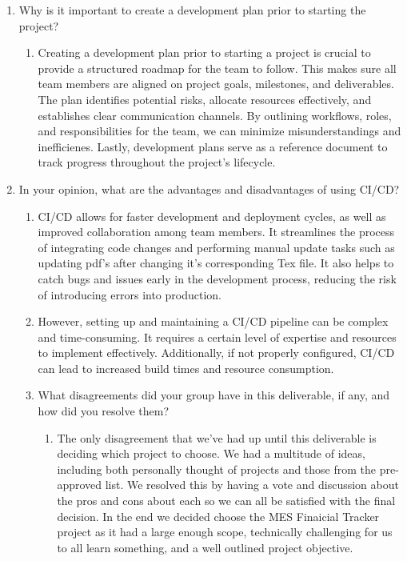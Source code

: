 \documentclass{article}
\begin{document}
\begin{enumerate}
    \item Why is it important to create a development plan prior to starting the
    project?
    \begin{enumerate}
      \item Creating a development plan prior to starting a project is crucial to provide a 
      structured roadmap for the team to follow. This makes sure all team members are aligned on 
      project goals, milestones, and deliverables. The plan identifies potential risks, allocate resources
      effectively, and establishes clear communication channels. By outlining workflows, roles, 
      and responsibilities for the team, we can minimize misunderstandings and inefficienes. Lastly, 
      development plans serve as a reference document to track progress throughout the project's lifecycle.
    \end{enumerate}
    \item In your opinion, what are the advantages and disadvantages of using
    CI/CD?
    \begin{enumerate}
        \item CI/CD allows for faster development and deployment cycles, as well as
        improved collaboration among team members. It streamlines the process of integrating code changes and performing manual update tasks such as updating pdf's after changing it's corresponding Tex file.
        It also helps to catch bugs and issues early in the development process, reducing the risk of introducing errors into production.
        \item However, setting up and maintaining a CI/CD pipeline can be complex and time-consuming. It requires a certain level of expertise and resources to implement effectively. Additionally, if not properly configured, CI/CD can lead to increased build times and resource consumption.
    \item What disagreements did your group have in this deliverable, if any,
    and how did you resolve them?
      \begin{enumerate}
        \item The only disagreement that we've had up until this deliverable is deciding which project to 
        choose. We had a multitude of ideas, including both personally thought of projects and those from the 
        pre-approved list. We resolved this by having a vote and discussion about the pros and cons about each
        so we can all be satisfied with the final decision. In the end we decided choose the MES Finaicial Tracker 
        project as it had a large enough scope, technically challenging for us to all learn something, and a well 
        outlined project objective. 
      \end{enumerate}
\end{enumerate}




\end{enumerate}
\end{document}
